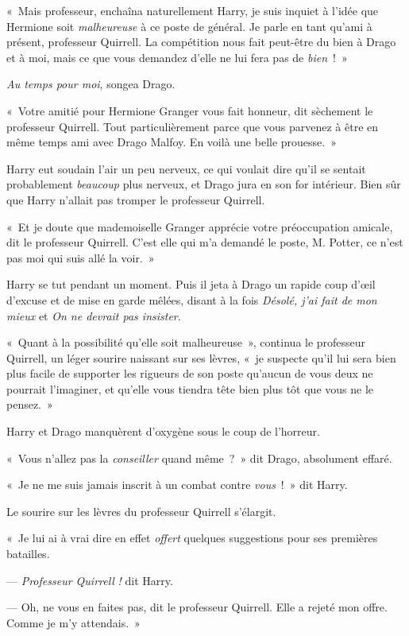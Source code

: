 «~Mais professeur, enchaîna naturellement Harry, je suis inquiet à l'idée que Hermione soit \emph{malheureuse} à ce poste de général. Je parle en tant qu'ami à présent, professeur Quirrell. La compétition nous fait peut-être du bien à Drago et à moi, mais ce que vous demandez d'elle ne lui fera pas de \emph{bien}~!~»

\emph{Au temps pour moi}, songea Drago.

«~Votre amitié pour Hermione Granger vous fait honneur, dit sèchement le professeur Quirrell. Tout particulièrement parce que vous parvenez à être en même temps ami avec Drago Malfoy. En voilà une belle prouesse.~»

Harry eut soudain l'air un peu nerveux, ce qui voulait dire qu'il se sentait probablement \emph{beaucoup} plus nerveux, et Drago jura en son for intérieur. Bien sûr que Harry n'allait pas tromper le professeur Quirrell.

«~Et je doute que mademoiselle Granger apprécie votre préoccupation amicale, dit le professeur Quirrell. C'est elle qui m'a demandé le poste, M. Potter, ce n'est pas moi qui suis allé la voir.~»

Harry se tut pendant un moment. Puis il jeta à Drago un rapide coup d'œil d'excuse et de mise en garde mêlées, disant à la fois \emph{Désolé, j'ai fait de mon mieux} et \emph{On ne devrait pas insister}.

«~Quant à la possibilité qu'elle soit malheureuse~», continua le professeur Quirrell, un léger sourire naissant sur ses lèvres, «~je suspecte qu'il lui sera bien plus facile de supporter les rigueurs de son poste qu'aucun de vous deux ne pourrait l'imaginer, et qu'elle vous tiendra tête bien plus tôt que vous ne le pensez.~»

Harry et Drago manquèrent d'oxygène sous le coup de l'horreur.

«~Vous n'allez pas la \emph{conseiller} quand même~?~» dit Drago, absolument effaré.

«~Je ne me suis jamais inscrit à un combat contre \emph{vous}~!~» dit Harry.

Le sourire sur les lèvres du professeur Quirrell s'élargit.

«~Je lui ai à vrai dire en effet \emph{offert} quelques suggestions pour ses premières batailles.

--- \emph{Professeur Quirrell} \emph{!} dit Harry.

--- Oh, ne vous en faites pas, dit le professeur Quirrell. Elle a rejeté mon offre. Comme je m'y attendais.~»

